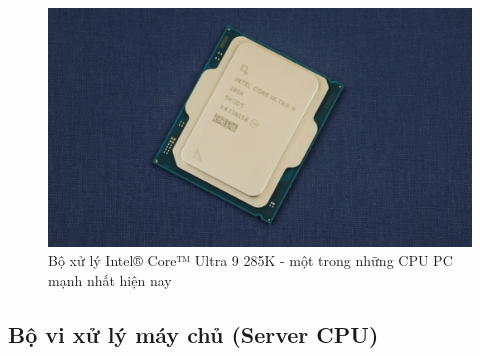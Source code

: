 \begin{figure}[H]
    \centering
    \includegraphics[width=0.85\linewidth]{img/cpu_pc.png}
    \caption{Bộ xử lý Intel® Core™ Ultra 9 285K - một trong những CPU PC mạnh nhất hiện nay}
\end{figure}

\subsection{Bộ vi xử lý máy chủ (Server CPU)}

